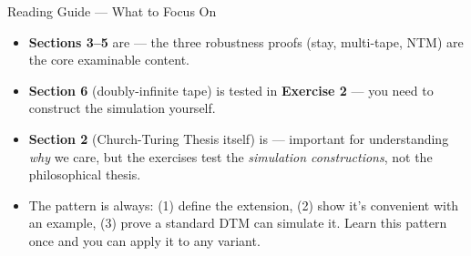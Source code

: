 \begin{notebox}{Reading Guide --- What to Focus On}
\begin{itemize}[nosep]
\item \textbf{Sections 3--5} are \kemark{} --- the three robustness proofs (stay, multi-tape, NTM) are the core examinable content.
\item \textbf{Section 6} (doubly-infinite tape) is tested in \textbf{Exercise 2} --- you need to construct the simulation yourself.
\item \textbf{Section 2} (Church-Turing Thesis itself) is \kbg{} --- important for understanding \textit{why} we care, but the exercises test the \textit{simulation constructions}, not the philosophical thesis.
\item The pattern is always: (1) define the extension, (2) show it's convenient with an example, (3) prove a standard DTM can simulate it. Learn this pattern once and you can apply it to any variant.
\end{itemize}
\end{notebox}
